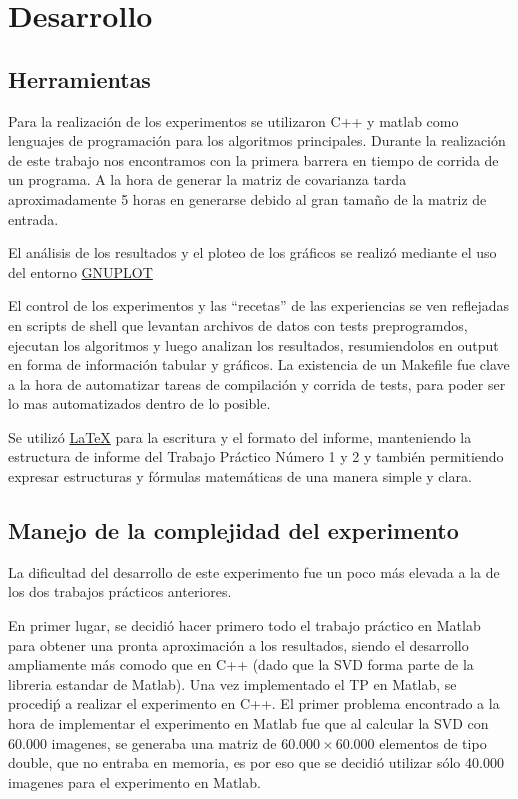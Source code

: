 \section{Desarrollo}

\subsection{Herramientas}

Para la realizaci\'on de los experimentos se utilizaron C++ y matlab como lenguajes de
programaci\'on para los algoritmos principales. Durante la realizaci\'on de este trabajo nos encontramos con 
la primera barrera en tiempo de corrida de un programa. A la hora de generar la matriz de covarianza tarda
aproximadamente 5 horas en generarse debido al gran tama\~no de la matriz de entrada. 

El an\'alisis de los resultados y el ploteo de los gr\'aficos se realiz\'o
mediante el uso del entorno \href{http://www.gnuplot.info/}{GNUPLOT}

El control de los experimentos y las ``recetas'' de las experiencias se ven
reflejadas en scripts de shell que levantan archivos de datos con tests
preprogramdos, ejecutan los algoritmos y luego analizan los resultados,
resumiendolos en output en forma de informaci\'on tabular y gr\'aficos.
La existencia de un Makefile fue clave a la hora de automatizar tareas de
compilaci\'on y corrida de tests, para poder ser lo mas automatizados dentro de
lo posible.

Se utiliz\'o \href{http://www.latex-project.org/}{LaTeX} para la escritura y el formato del informe,
 manteniendo la estructura de informe del Trabajo Pr\'actico N\'umero 1 y 2 y tambi\'en
permitiendo expresar estructuras y f\'ormulas matem\'aticas de una manera simple y clara.

\subsection{Manejo de la complejidad del experimento}

La dificultad del desarrollo de este experimento fue un poco m\'as elevada a la de los dos 
trabajos pr\'acticos anteriores. 

En primer lugar, se decidi\'o hacer primero todo el trabajo pr\'actico en Matlab para obtener 
una pronta aproximaci\'on a los resultados, siendo el desarrollo ampliamente m\'as comodo que 
en C++ (dado que la SVD forma parte de la libreria estandar de Matlab). Una vez implementado 
el TP en Matlab, se procedi\'p a realizar el experimento en C++. El primer problema encontrado 
a la hora de implementar el experimento en Matlab fue que al calcular la SVD con 60.000 imagenes, 
se generaba una matriz de $60.000 \times 60.000$ elementos de tipo double, que no entraba en
memoria, es por eso que se decidi\'o utilizar s\'olo 40.000 imagenes para el experimento en Matlab.

